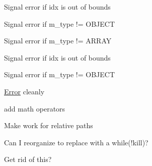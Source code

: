 \begin{DoxyRefList}
Signal error if idx is out of bounds  
\item[\label{todo__todo000018}%
\Hypertarget{todo__todo000018}%
Member \hyperlink{classnta_1_1utils_1_1Json_ab3b51a07ebed90330c98fd8e20785781}{nta\+:\+:utils\+:\+:Json\+:\+:operator\mbox{[}\mbox{]}} (crstring key) const]Signal error if m\+\_\+type != O\+B\+J\+E\+CT  
\item[\label{todo__todo000019}%
\Hypertarget{todo__todo000019}%
Member \hyperlink{classnta_1_1utils_1_1Json_a236b5885612b74c21fbad169b21eaf55}{nta\+:\+:utils\+:\+:Json\+:\+:operator\mbox{[}\mbox{]}} (std\+::size\+\_\+t idx)]Signal error if m\+\_\+type != A\+R\+R\+AY 

Signal error if idx is out of bounds  
\item[\label{todo__todo000017}%
\Hypertarget{todo__todo000017}%
Member \hyperlink{classnta_1_1utils_1_1Json_adf2d340a2bf7d59c537e398a1be66cf7}{nta\+:\+:utils\+:\+:Json\+:\+:operator\mbox{[}\mbox{]}} (crstring key)]Signal error if m\+\_\+type != O\+B\+J\+E\+CT  
\item[\label{todo__todo000024}%
\Hypertarget{todo__todo000024}%
Member \hyperlink{classnta_1_1utils_1_1Json_a905d67b125a7aadd771bb74a1bb63f34}{nta\+:\+:utils\+:\+:Json\+:\+:tokenize} (std\+::string curr)]\hyperlink{structnta_1_1Error}{Error} cleanly  
\item[\label{todo__todo000005}%
\Hypertarget{todo__todo000005}%
Class \hyperlink{classnta_1_1utils_1_1JsonNum}{nta\+:\+:utils\+:\+:Json\+Num} ]add math operators 
\item[\label{todo__todo000026}%
\Hypertarget{todo__todo000026}%
Member \hyperlink{classnta_1_1utils_1_1Path_aa124dc05466b3f681d02579fa0022a6a}{nta\+:\+:utils\+:\+:Path\+:\+:parent} () const]Make work for relative paths  
\item[\label{todo__todo000030}%
\Hypertarget{todo__todo000030}%
Member \hyperlink{classnta_1_1utils_1_1ThreadPool_a2ca98ba5ed4510e5aac90c0507859b8d}{nta\+:\+:utils\+:\+:Thread\+Pool\+:\+:dispatcher} ()]Can I reorganize to replace with a while(!kill)?  
\item[\label{todo__todo000032}%
\Hypertarget{todo__todo000032}%
Member \hyperlink{classnta_1_1Window_aa144f6bb014aaad3c91c3f3e6ad56f9c}{nta\+:\+:Window\+:\+:screenshot} () const]Get rid of this? 
\end{DoxyRefList}